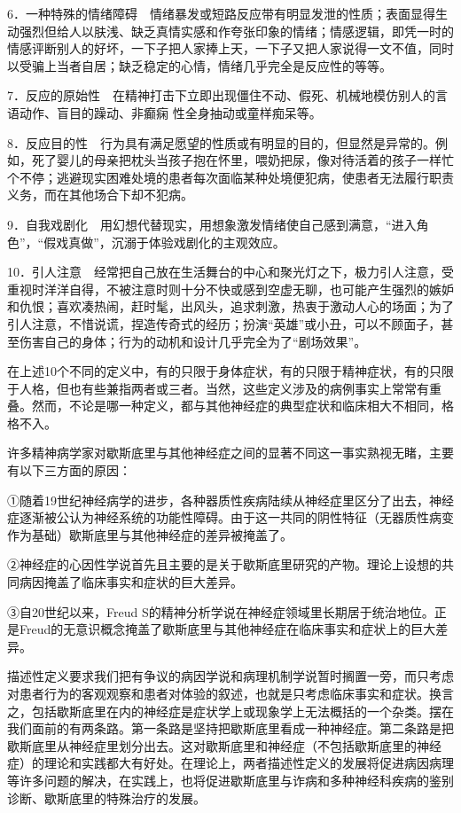 6．一种特殊的情绪障碍　情绪暴发或短路反应带有明显发泄的性质；表面显得生动强烈但给人以肤浅、缺乏真情实感和作夸张印象的情绪；情感逻辑，即凭一时的情感评断别人的好坏，一下子把人家捧上天，一下子又把人家说得一文不值，同时以受骗上当者自居；缺乏稳定的心情，情绪几乎完全是反应性的等等。

7．反应的原始性　在精神打击下立即出现僵住不动、假死、机械地模仿别人的言语动作、盲目的躁动、非癫痫
性全身抽动或童样痴呆等。

8．反应目的性　行为具有满足愿望的性质或有明显的目的，但显然是异常的。例如，死了婴儿的母亲把枕头当孩子抱在怀里，喂奶把尿，像对待活着的孩子一样忙个不停；逃避现实困难处境的患者每次面临某种处境便犯病，使患者无法履行职责义务，而在其他场合下却不犯病。

9．自我戏剧化　用幻想代替现实，用想象激发情绪使自己感到满意，“进入角色”，“假戏真做”，沉溺于体验戏剧化的主观效应。

10．引人注意　经常把自己放在生活舞台的中心和聚光灯之下，极力引人注意，受重视时洋洋自得，不被注意时则十分不快或感到空虚无聊，也可能产生强烈的嫉妒和仇恨；喜欢凑热闹，赶时髦，出风头，追求刺激，热衷于激动人心的场面；为了引人注意，不惜说谎，捏造传奇式的经历；扮演“英雄”或小丑，可以不顾面子，甚至伤害自己的身体；行为的动机和设计几乎完全为了“剧场效果”。

在上述10个不同的定义中，有的只限于身体症状，有的只限于精神症状，有的只限于人格，但也有些兼指两者或三者。当然，这些定义涉及的病例事实上常常有重叠。然而，不论是哪一种定义，都与其他神经症的典型症状和临床相大不相同，格格不入。

许多精神病学家对歇斯底里与其他神经症之间的显著不同这一事实熟视无睹，主要有以下三方面的原因：

①随着19世纪神经病学的进步，各种器质性疾病陆续从神经症里区分了出去，神经症逐渐被公认为神经系统的功能性障碍。由于这一共同的阴性特征（无器质性病变作为基础）歇斯底里与其他神经症的差异被掩盖了。

②神经症的心因性学说首先且主要的是关于歇斯底里研究的产物。理论上设想的共同病因掩盖了临床事实和症状的巨大差异。

③自20世纪以来，Freud
S的精神分析学说在神经症领域里长期居于统治地位。正是Freud的无意识概念掩盖了歇斯底里与其他神经症在临床事实和症状上的巨大差异。

描述性定义要求我们把有争议的病因学说和病理机制学说暂时搁置一旁，而只考虑对患者行为的客观观察和患者对体验的叙述，也就是只考虑临床事实和症状。换言之，包括歇斯底里在内的神经症是症状学上或现象学上无法概括的一个杂类。摆在我们面前的有两条路。第一条路是坚持把歇斯底里看成一种神经症。第二条路是把歇斯底里从神经症里划分出去。这对歇斯底里和神经症（不包括歇斯底里的神经症）的理论和实践都大有好处。在理论上，两者描述性定义的发展将促进病因病理等许多问题的解决，在实践上，也将促进歇斯底里与诈病和多种神经科疾病的鉴别诊断、歇斯底里的特殊治疗的发展。

\protect\hypertarget{text00016.html}{}{}

